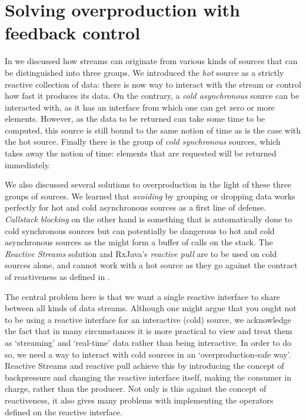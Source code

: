 \chapter{Solving overproduction with feedback control}
\label{chap:solving-overproduction}

In  we discussed how streams can originate from various kinds of sources that can be distinguished into three groups. We introduced the \textit{hot} source as a strictly reactive collection of data: there is now way to interact with the stream or control how fast it produces its data. On the contrary, a \textit{cold asynchronous} source can be interacted with, as it has an interface from which one can get zero or more elements. However, as the data to be returned can take some time to be computed, this source is still bound to the same notion of time as is the case with the hot source. Finally there is the group of \textit{cold synchronous} sources, which takes away the notion of time: elements that are requested will be returned immediately.

We also discussed several solutions to overproduction in the light of these three groups of sources. We learned that \textit{avoiding} by grouping or dropping data works perfectly for hot and cold asynchronous sources as a first line of defense. \textit{Callstack blocking} on the other hand is something that is automatically done to cold synchronous sources but can potentially be dangerous to hot and cold asynchronous sources as the might form a buffer of calls on the stack. The \textit{Reactive Streams} solution and RxJava's \textit{reactive pull} are to be used on cold sources alone, and cannot work with a hot source as they go against the contract of reactiveness as defined in \cite{berry1991-Reactive}.

The central problem here is that we want a single reactive interface to share between all kinds of data streams. Although one might argue that you ought not to be using a reactive interface for an interactive (cold) source, we acknowledge the fact that in many circumstances it is more practical to view and treat them as `streaming' and `real-time' data rather than being interactive. In order to do so, we need a way to interact with cold sources in an `overproduction-safe way'. Reactive Streams and reactive pull achieve this by introducing the concept of backpressure and changing the reactive interface itself, making the consumer in charge, rather than the producer. Not only is this against the concept of reactiveness, it also gives many problems with implementing the operators defined on the reactive interface.

